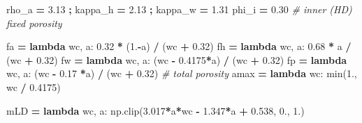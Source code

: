 \documentclass[
  a4paper,
  numbers=noendperiod,
  DIV=12]{scrreprt}
\newenvironment{Shaded}{\begin{snugshade}}{\end{snugshade}}
\newcommand{\BuiltInTok}[1]{#1}
\newcommand{\CommentTok}[1]{\textcolor[rgb]{0.56,0.35,0.01}{\textit{#1}}}
\newcommand{\FloatTok}[1]{\textcolor[rgb]{0.00,0.00,0.81}{#1}}
\newcommand{\KeywordTok}[1]{\textcolor[rgb]{0.13,0.29,0.53}{\textbf{#1}}}
\newcommand{\NormalTok}[1]{#1}
\newcommand{\OperatorTok}[1]{\textcolor[rgb]{0.81,0.36,0.00}{\textbf{#1}}}
\begin{document}
\begin{Shaded}
\begin{Highlighting}[]
\NormalTok{rho\_a }\OperatorTok{=} \FloatTok{3.13} \OperatorTok{;}\NormalTok{ kappa\_h }\OperatorTok{=} \FloatTok{2.13} \OperatorTok{;}\NormalTok{ kappa\_w }\OperatorTok{=} \FloatTok{1.31}
\NormalTok{phi\_i }\OperatorTok{=} \FloatTok{0.30}   \CommentTok{\# inner (HD) fixed porosity}

\NormalTok{fa   }\OperatorTok{=} \KeywordTok{lambda}\NormalTok{ wc, a: }\FloatTok{0.32} \OperatorTok{*}\NormalTok{ (}\FloatTok{1.}\OperatorTok{{-}}\NormalTok{a) }\OperatorTok{/}\NormalTok{ (wc }\OperatorTok{+} \FloatTok{0.32}\NormalTok{)}
\NormalTok{fh   }\OperatorTok{=} \KeywordTok{lambda}\NormalTok{ wc, a: }\FloatTok{0.68} \OperatorTok{*}\NormalTok{ a      }\OperatorTok{/}\NormalTok{ (wc }\OperatorTok{+} \FloatTok{0.32}\NormalTok{)}
\NormalTok{fw   }\OperatorTok{=} \KeywordTok{lambda}\NormalTok{ wc, a: (wc }\OperatorTok{{-}} \FloatTok{0.4175}\OperatorTok{*}\NormalTok{a) }\OperatorTok{/}\NormalTok{ (wc }\OperatorTok{+} \FloatTok{0.32}\NormalTok{)}
\NormalTok{fp   }\OperatorTok{=} \KeywordTok{lambda}\NormalTok{ wc, a: (wc }\OperatorTok{{-}} \FloatTok{0.17} \OperatorTok{*}\NormalTok{a) }\OperatorTok{/}\NormalTok{ (wc }\OperatorTok{+} \FloatTok{0.32}\NormalTok{)   }\CommentTok{\# total porosity}
\NormalTok{amax }\OperatorTok{=} \KeywordTok{lambda}\NormalTok{ wc:    }\BuiltInTok{min}\NormalTok{(}\FloatTok{1.}\NormalTok{, wc }\OperatorTok{/} \FloatTok{0.4175}\NormalTok{)}

\NormalTok{mLD  }\OperatorTok{=} \KeywordTok{lambda}\NormalTok{ wc, a: np.clip(}\FloatTok{3.017}\OperatorTok{*}\NormalTok{a}\OperatorTok{*}\NormalTok{wc }\OperatorTok{{-}} \FloatTok{1.347}\OperatorTok{*}\NormalTok{a }\OperatorTok{+} \FloatTok{0.538}\NormalTok{, }\FloatTok{0.}\NormalTok{, }\FloatTok{1.}\NormalTok{)}


\end{Highlighting}
\end{Shaded}
\end{document}
